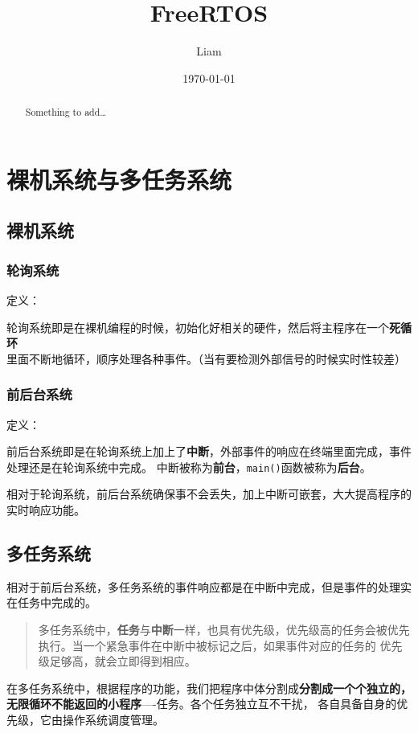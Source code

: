 \documentclass[11pt,a4paper]{ctexart}
\title{FreeRTOS}
\author{Liam}
\date{\today}
\begin{document}
\maketitle

\begin{abstract}
Something to add\dots
\end{abstract}

\section{裸机系统与多任务系统}
\subsection{裸机系统}
\subsubsection{轮询系统}
\textcolor{myblue}{定义}：
\par
轮询系统即是在裸机编程的时候，初始化好相关的硬件，然后将主程序在一个\textbf{死循环}里面不断地循环，顺序处理各种事件。（当有要检测外部信号的时候实时性较差）
\subsubsection{前后台系统}
\textcolor{myblue}{定义}：
\par
前后台系统即是在轮询系统上加上了\textbf{中断}，外部事件的响应在终端里面完成，事件处理还是在轮询系统中完成。
中断被称为\textbf{前台}，\colorbox{mygrey}{\color{myred}\lstinline|main()|}函数被称为\textbf{后台}。
~\\
\par
相对于轮询系统，前后台系统确保事不会丢失，加上中断可嵌套，大大提高程序的实时响应功能。
\subsection{多任务系统}
相对于前后台系统，多任务系统的事件响应都是在中断中完成，但是事件的处理实在任务中完成的。

\begin{quote}
	多任务系统中，\textbf{任务}与\textbf{中断}一样，也具有优先级，优先级高的任务会被优先执行。当一个紧急事件在中断中被标记之后，如果事件对应的任务的
	优先级足够高，就会立即得到相应。
\end{quote}
\par
在多任务系统中，根据程序的功能，我们把程序中体分割成\textbf{分割成一个个独立的，无限循环不能返回的小程序}----任务。各个任务独立互不干扰，
各自具备自身的优先级，它由操作系统调度管理。
\end{document}
